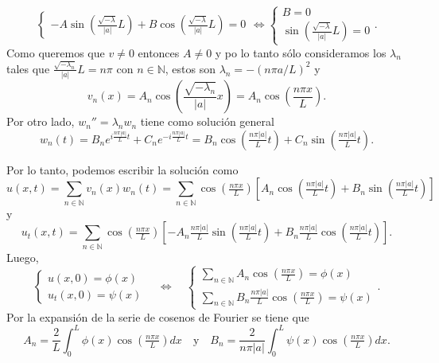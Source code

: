 \documentclass[12pt]{article}
\newcommand{\N}{\mathbb{N}}
\newcommand{\pp}[1]{\left( #1 \right)}
\newcommand{\cc}[1]{\left[ #1 \right]}
\newcommand{\Text}[1]{\quad\text{#1}\quad}
\newcommand{\ssi}{\Longleftrightarrow}
\newcommand{\Ssi}{\quad\Longleftrightarrow\quad}
\renewcommand{\l}{\lambda}
\begin{document}
\begin{enumerate}
\[\begin{cases}
            -A\sin\pp{\tfrac{\sqrt{-\l}}{|a|}L}+ B\cos\pp{\tfrac{\sqrt{-\l}}{|a|}L}=0
        \end{cases}\ssi\begin{cases}
            B=0\\
            \sin\pp{\tfrac{\sqrt{-\l}}{|a|}L}=0
        \end{cases}. \]
        Como queremos que $v\neq 0$ entonces $A\neq 0$ y po lo tanto sólo consideramos los $\l_n$ tales que $\tfrac{\sqrt{-\l_n}}{|a|}L=n\pi$ con $n\in\N$, estos son $\l_n=-(n\pi a/L)^2$ y
        \[ v_n(x)= A_n\cos\pp{\frac{\sqrt{-\l_n}}{|a|}x}= A_n\cos\pp{\frac{n\pi x}{L}}.\]
        Por otro lado, ${w_n}''=\l_nw_n$ tiene como solución general
        \[ w_n(t)=B_ne^{i\tfrac{n\pi |a|}{L}t}+ C_n e^{-i\tfrac{n\pi |a|}{L}t}= B_n\cos\pp{\tfrac{n\pi |a|}{L}t}+ C_n\sin\pp{\tfrac{n\pi |a|}{L}t}. \]

        Por lo tanto, podemos escribir la solución como
        \[ u(x,t) = \sum_{n\in\N}v_n(x)w_n(t)=\sum_{n\in\N}\cos\pp{\tfrac{n\pi x}{L}}\cc{A_n\cos\pp{\tfrac{n\pi |a|}{L}t}+ B_n\sin\pp{\tfrac{n\pi |a|}{L}t}}\]
        y
        \[ u_t(x,t) = \sum_{n\in\N}\cos\pp{\tfrac{n\pi x}{L}}\cc{-A_n \tfrac{n\pi |a|}{L}\sin\pp{\tfrac{n\pi |a|}{L}t}+ B_n\tfrac{n\pi |a|}{L}\cos\pp{\tfrac{n\pi |a|}{L}t}}.\]
        Luego,
        \[ \begin{cases}
                u(x,0)=\phi(x)\\
                u_t(x,0)=\psi(x)
            \end{cases}
            \Ssi
            \begin{cases}
                \sum_{n\in\N}A_n\cos\pp{\tfrac{n\pi x}{L}}=\phi(x)\\
                \sum_{n\in\N}B_n\tfrac{n\pi |a|}{L}\cos\pp{\tfrac{n\pi x}{L}}=\psi(x)
            \end{cases}. \]
        Por la expansión de la serie de cosenos de Fourier se tiene que
        \[ A_n = \frac{2}{L}\int_0^{L}\phi(x)\cos\pp{\tfrac{n\pi x}{L}}dx\Text{y}B_n= \frac{2}{n\pi|a|}\int_0^{L}\psi(x)\cos\pp{\tfrac{n\pi x}{L}}dx.\]


\end{enumerate}
\end{document}
